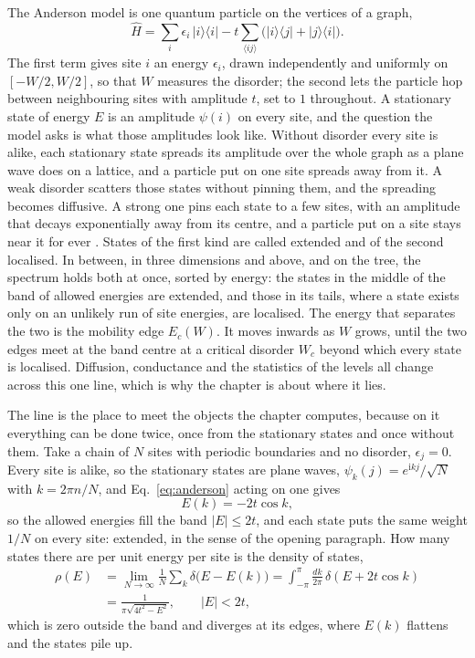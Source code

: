 The Anderson model is one quantum particle on the vertices of a graph,
\begin{equation}
  \hat H=\sum_{i}\epsilon_{i}\,|i\rangle\langle i|
  -t\sum_{\langle ij\rangle}\bigl(|i\rangle\langle j|+|j\rangle\langle i|\bigr).
  \label{eq:anderson}
\end{equation}
The first term gives site $i$ an energy $\epsilon_{i}$, drawn
independently and uniformly on $[-W/2,W/2]$, so that $W$ measures the
disorder; the second lets the particle hop between neighbouring sites
with amplitude $t$, set to $1$ throughout. A stationary state of energy
$E$ is an amplitude $\psi(i)$ on every site, and the question the model
asks is what those amplitudes look like. Without disorder every site is
alike, each stationary state spreads its amplitude over the whole graph
as a plane wave does on a lattice, and a particle put on one site spreads
away from it. A weak disorder scatters those states without pinning them,
and the spreading becomes diffusive. A strong one pins each state to a
few sites, with an amplitude that decays exponentially away from its
centre, and a particle put on a site stays near it for ever
\citep{anderson1958}. States of the first kind are called extended and of
the second localised. In between, in three dimensions and above, and on the tree,
the spectrum holds both at once, sorted by energy: the states in the
middle of the band of allowed energies are extended, and those in its
tails, where a state exists only on an unlikely run of site energies, are
localised. The energy that separates the two is the mobility edge
$E_{c}(W)$. It moves inwards as $W$ grows, until the two edges meet at
the band centre at a critical disorder $W_{c}$ beyond which every state
is localised. Diffusion, conductance and the statistics of the levels all
change across this one line, which is why the chapter is about where it
lies.

The line is the place to meet the objects the chapter computes, because
on it everything can be done twice, once from the stationary states and
once without them. Take a chain of $N$ sites with periodic boundaries and
no disorder, $\epsilon_{j}=0$. Every site is alike, so the stationary
states are plane waves, $\psi_{k}(j)=e^{\mathrm{i}kj}/\sqrt{N}$ with
$k=2\pi n/N$, and Eq.~\eqref{eq:anderson} acting on one gives
\begin{equation}
  E(k)=-2t\cos k,
  \label{eq:linedispersion}
\end{equation}
so the allowed energies fill the band $|E|\le2t$, and each state puts the
same weight $1/N$ on every site: extended, in the sense of the opening
paragraph. How many states there are per unit energy per site is the
density of states,
\begin{equation}
  \begin{split}
  \rho(E)&=\lim_{N\to\infty}\frac{1}{N}\sum_{k}\delta\bigl(E-E(k)\bigr)
  =\int_{-\pi}^{\pi}\frac{dk}{2\pi}\,\delta(E+2t\cos k)\\
  &=\frac{1}{\pi\sqrt{4t^{2}-E^{2}}},
  \qquad |E|<2t,
  \end{split}
  \label{eq:linedos}
\end{equation}
which is zero outside the band and diverges at its edges, where $E(k)$
flattens and the states pile up.

